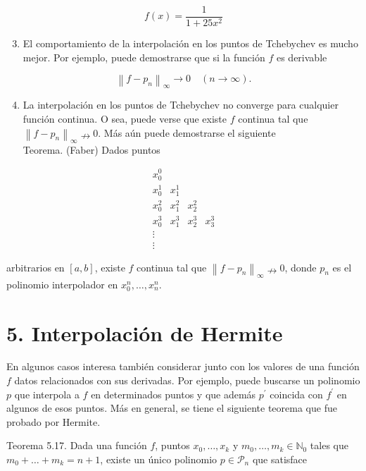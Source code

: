 \documentclass[10pt]{article}
\begin{document}
$$
f(x)=\frac{1}{1+25 x^{2}}
$$

\begin{enumerate}
  \setcounter{enumi}{2}
  \item El comportamiento de la interpolación en los puntos de Tchebychev es mucho mejor. Por ejemplo, puede demostrarse que si la función $f$ es derivable
\end{enumerate}

$$
\left\|f-p_{n}\right\|_{\infty} \rightarrow 0 \quad(n \rightarrow \infty) .
$$

\begin{enumerate}
  \setcounter{enumi}{3}
  \item La interpolación en los puntos de Tchebychev no converge para cualquier función continua. O sea, puede verse que existe $f$ continua tal que $\left\|f-p_{n}\right\|_{\infty} \nrightarrow 0$. Más aún puede demostrarse el siguiente\\
Teorema. (Faber) Dados puntos
\end{enumerate}

$$
\begin{array}{cccc}
x_{0}^{0} & & & \\
x_{0}^{1} & x_{1}^{1} & & \\
x_{0}^{2} & x_{1}^{2} & x_{2}^{2} & \\
x_{0}^{3} & x_{1}^{3} & x_{2}^{3} & x_{3}^{3} \\
\vdots & & & \\
\vdots & & &
\end{array}
$$

arbitrarios en $[a, b]$, existe $f$ continua tal que $\left\|f-p_{n}\right\|_{\infty} \nrightarrow 0$, donde $p_{n}$ es el polinomio interpolador en $x_{0}^{n}, \ldots, x_{n}^{n}$.

\section*{5. Interpolación de Hermite}
En algunos casos interesa también considerar junto con los valores de una función $f$ datos relacionados con sus derivadas. Por ejemplo, puede buscarse un polinomio $p$ que interpola a $f$ en determinados puntos y que además $p^{\prime}$ coincida con $f^{\prime}$ en algunos de esos puntos. Más en general, se tiene el siguiente teorema que fue probado por Hermite.

Teorema 5.17. Dada una función $f$, puntos $x_{0}, \ldots, x_{k}$ y $m_{0}, \ldots, m_{k} \in \mathbb{N}_{0}$ tales que $m_{0}+\ldots+ m_{k}=n+1$, existe un único polinomio $p \in \mathcal{P}_{n}$ que satisface
\end{document}
